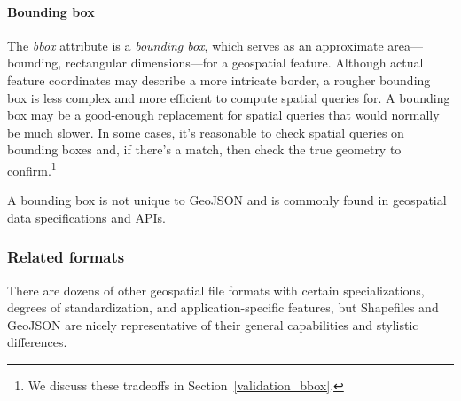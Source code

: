 \paragraph{Bounding box}
The \textit{bbox} attribute is a \textit{bounding box}, which serves as an approximate area---bounding, rectangular dimensions---for a geospatial feature. Although actual feature coordinates may describe a more intricate border, a rougher bounding box is less complex and more efficient to compute spatial queries for. A bounding box may be a good-enough replacement for spatial queries that would normally be much slower. In some cases, it's reasonable to check spatial queries on bounding boxes and, if there's a match, then check the true geometry to confirm.\footnote{We discuss these tradeoffs in Section~\ref{validation_bbox}.}

A bounding box is not unique to GeoJSON and is commonly found in geospatial data specifications and APIs.

\subsubsection{Related formats}
There are dozens of other geospatial file formats with certain specializations, degrees of standardization, and application-specific features, but Shapefiles and GeoJSON are nicely representative of their general capabilities and stylistic differences.